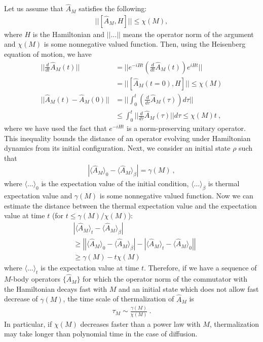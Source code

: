 \documentclass[twocolumn,superscriptaddress, prb]{revtex4-1}
\begin{document}
Let us assume that $\hat{A}_M$ satisfies the following:
\begin{align}
||[\hat{A}_M, H]|| \leq \chi(M),
\end{align}
where $H$ is the Hamiltonian and $||\ldots||$ means the operator norm of the argument and $\chi(M)$ is some nonnegative valued function.
Then, using the Heisenberg equation of motion, we have
\begin{align}
\bigg|\bigg|\frac{d}{dt} \hat{A}_M(t)\bigg|\bigg| &= \bigg|\bigg| e^{-i H t} \left(\frac{d}{dt} \hat{A}_M (t)\right) e^{i H t} \bigg|\bigg| \nonumber\\
&= ||[\hat{A}_M(t = 0), H]|| \leq \chi(M) \\
||\hat{A}_M(t) - \hat{A}_M(0)|| &= \bigg|\bigg|\int_0^t \left(\frac{d}{d\tau} \hat{A}_M(\tau)\right)d\tau \bigg|\bigg| \nonumber\\
&\leq \int^t_0 \big|\big|\frac{d}{d\tau} \hat{A}_M(\tau)\big|\big|d\tau \leq \chi(M) t ~,
\end{align}
where we have used the fact that $e^{-iHt}$ is a norm-preserving unitary operator.
This inequality bounds the distance of an operator evolving under Hamiltonian dynamics
from its initial configuration. Next, we consider an initial state $\rho$ such that
\begin{align}
|\langle \hat{A}_M \rangle_0 - \langle \hat{A}_M \rangle_\beta| = \gamma(M) ~,
\end{align}
where $\langle \ldots \rangle_0$ is the expectation value of the initial condition, $\langle \ldots \rangle_\beta$
is thermal expectation value and $\gamma(M)$ is some nonnegative valued function.
Now we can estimate the distance between the thermal expectation value and the expectation value at time $t$ (for $t \leq \gamma(M)/\chi(M)$):
\begin{align}
&|\langle \hat{A}_M \rangle_t - \langle \hat{A}_M \rangle_\beta| \nonumber\\
&\geq \left | |\langle \hat{A}_M\rangle_0 - \langle \hat{A}_M\rangle_\beta | -|\langle \hat{A}_M\rangle_t - \langle \hat{A}_M\rangle_0 |\right | \nonumber\\
&\geq \gamma(M) - t \chi(M)
\end{align}
where $\langle \ldots \rangle_t$ is the expectation value at time $t$.
Therefore, if we have a sequence of $M$-body operators $\{ \hat{A}_M \}$
for which the operator norm of the commutator with the Hamiltonian decays fast with $M$
and an initial state which does not allow fast decrease of $\gamma(M)$,
the time scale of thermalization of $\hat{A}_M$ is
\begin{align}
\tau_M \sim \frac{\gamma(M)}{\chi(M)} ~.
\end{align}
In particular, if $\chi(M)$ decreases faster than a power law with $M$,
thermalization may take longer than polynomial time in the case of diffusion.
\end{document}
